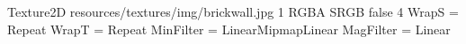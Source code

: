 Texture2D
resources/textures/img/brickwall.jpg
1
RGBA
SRGB
false
4
WrapS = Repeat
WrapT = Repeat
MinFilter = LinearMipmapLinear
MagFilter = Linear

